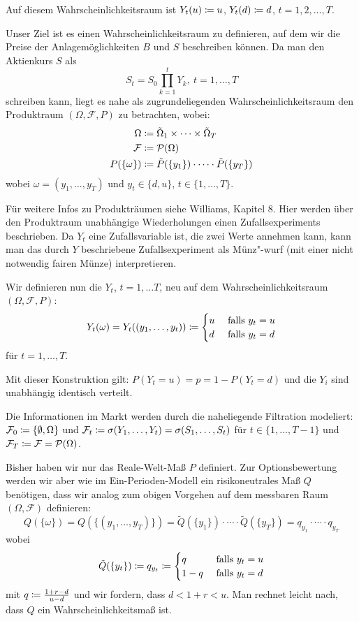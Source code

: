 \documentclass[a4paper,twoside,DIV15,BCOR12mm]{scrbook}
\newcommand{\cF}{\mathcal F}
\begin{document}
Auf diesem Wahrscheinlichkeitsraum ist $Y_t(u)\da u$, $Y_t(d)\da d$, $t=1, 2,\ldots, T$.

 Unser Ziel ist es einen Wahrscheinlichkeitsraum zu definieren, auf dem wir die Preise der Anlagemöglichkeiten $B$ und $S$ beschreiben können. Da man den Aktienkurs $S$ als
\[
S_t=S_0 \prod_{k=1}^t Y_k,\ t=1,\ldots, T
\]
schreiben kann, liegt es nahe als zugrundeliegenden Wahrscheinlichkeitsraum den Produktraum $(\Omega, \cF, P)$ zu betrachten, wobei:
\begin{align*}
\Omega &\da \tilde\Omega_1 \times \cdots \times \tilde\Omega_T \\ %
\cF &\da \mathcal{P}(\Omega) \\
P(\{\omega\}) &\da \tilde{P}(\{y_1\})\cdot \cdots\cdot \tilde{P}(\{y_T\})
\end{align*}
wobei $\omega=(y_1, \ldots, y_T)$ und $y_t \in \{d,u\}$, $t\in\{1,\ldots,T\}$.

Für weitere Infos zu Produkträumen siehe Williams, Kapitel 8. Hier werden über den Produktraum unabhängige Wiederholungen einen Zufallsexperiments beschrieben. Da $Y_t$ eine Zufallsvariable ist, die zwei Werte annehmen kann, kann man das durch $Y$ beschriebene Zufallsexperiment als Münz"-wurf (mit einer nicht notwendig fairen Münze) interpretieren.


 Wir definieren nun die $Y_t$, $t=1, \ldots T$, neu auf dem Wahrscheinlichkeitsraum $(\Omega, \cF , P)$:
\[
Y_t(\omega)=Y_t((y_1,\ldots,y_t))\da 
 \begin{cases}
 u & \mbox{ falls } y_t=u\\
 d & \mbox{ falls } y_t=d
 \end{cases}
\]
für $t=1, \ldots, T$.

 Mit dieser Konstruktion gilt: $P(Y_t=u)=p=1-P(Y_t=d)$ und die $Y_i$ sind unabhängig identisch verteilt.

 Die Informationen im Markt werden durch die naheliegende Filtration modeliert:
 $\cF_0\da \{\emptyset, \Omega\}$ und $\cF_t\da \sigma(Y_1,\ldots,Y_t)=\sigma(S_1,\ldots, S_t)$ für $t\in\{1,\ldots, T-1\}$ und $\cF_T\da \cF=\mathcal{P}(\Omega)$.

 Bisher haben wir nur das Reale-Welt-Maß $P$ definiert. Zur Optionsbewertung werden wir aber wie im Ein-Perioden-Modell ein risikoneutrales Maß $Q$ benötigen, dass wir analog zum obigen Vorgehen auf dem messbaren Raum $(\Omega, \cF)$ definieren:
\[
Q(\{\omega\}) = Q(\{(y_1,\ldots, y_T)\})=\tilde{Q}(\{y_1\}) \cdot\cdots\cdot \tilde{Q}(\{y_T\})=q_{y_1} \cdot\cdots\cdot q_{y_T}
\]
wobei
\[\tilde Q(\{y_t\})\da q_{y_t}\da
\begin{cases}
 q & \mbox{ falls } y_t=u\\
 1-q & \mbox{ falls } y_t=d
 \end{cases}
\]
mit $q\da \frac{1+r-d}{u-d}$ und wir fordern, dass $d<1+r<u$. Man rechnet leicht nach, dass $Q$ ein Wahrscheinlichkeitsmaß ist.
 
\end{document}
